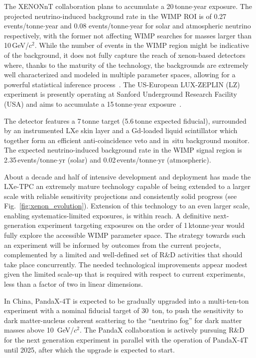 The XENONnT collaboration plans to accumulate a 20\,tonne$\cdot$year exposure. The projected neutrino-induced background rate in the WIMP ROI is of 0.27 events/tonne$\cdot$year and 0.08 events/tonne$\cdot$year for solar and atmospheric neutrino respectively, with the former not affecting WIMP searches for masses larger than 10\,GeV/c$^2$. While the number of events in the WIMP region might be indicative of the background, it does not fully capture the reach of xenon-based detectors where, thanks to the maturity of the technology, the backgrounds are extremely well characterized and modeled in multiple parameter spaces, allowing for a powerful statistical inference process~\cite{XENON:2020kmp}. 
The US-European LUX-ZEPLIN (LZ) experiment is presently operating at Sanford Underground Research Facility (USA) and aims to accumulate a 15\,tonne$\cdot$year exposure~\cite{AKERIB201804}.

The detector features a 7\,tonne target (5.6\,tonne expected fiducial), surrounded by an instrumented LXe skin layer and a Gd-loaded liquid scintillator which together form an efficient anti-coincidence veto and in~situ background monitor. The expected neutrino-induced background rate in the WIMP signal region is 2.35\,events/tonne$\cdot$yr (solar) and 0.02\,events/tonne$\cdot$yr (atmospheric).

About a decade and half of intensive development and deployment has made the LXe-TPC an extremely mature technology capable of being extended to a larger scale with reliable sensitivity projections and consistently solid progress (see Fig.~\ref{fig:xenon_evolution}). Extension of this technology to an even larger scale, enabling systematics-limited exposures, is within reach. A definitive next-generation experiment targeting exposures on the order of 1\,ktonne$\cdot$year would fully explore the accessible WIMP parameter space. The strategy towards such an experiment will be informed by outcomes from the current projects, complemented by a limited and well-defined set of R\&D activities that should take place concurrently. The needed technological improvements appear modest given the limited scale-up that is required with respect to current experiments, less than a factor of two in linear dimensions. 

In China, PandaX-4T is expected to be gradually upgraded into a multi-ten-ton experiment with a nominal fiducial target of 30~ton, to push the sensitivity to dark matter-nucleus coherent scattering to the “neutrino fog” for dark matter masses above 10~GeV/$c^2$. The PandaX collaboration is actively pursuing R\&D for the next generation experiment in parallel with the operation of PandaX-4T until 2025, after which the upgrade is expected to start.


